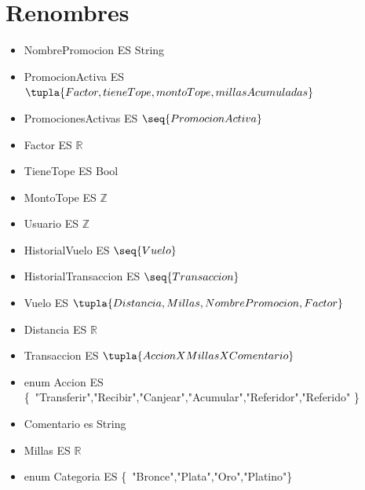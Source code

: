 \documentclass[11pt,a4paper]{article}
\begin{document}
\maketitle

\section{Renombres}

\begin{itemize}
    \item[]NombrePromocion ES String
    \item[]PromocionActiva ES $\tupla{Factor, tieneTope, montoTope, millasAcumuladas}$
    \item[]PromocionesActivas ES $\seq{PromocionActiva}$
    \item[]Factor ES $\mathbb{R}$ 
    \item[]TieneTope ES Bool
    \item[]MontoTope ES $\mathbb{Z}$    
    \item[]Usuario ES $\mathbb{Z}$  
    \item[]HistorialVuelo ES $\seq{Vuelo}$
    \item[]HistorialTransaccion ES $\seq{Transaccion}$
    \item[]Vuelo ES $\tupla{Distancia,Millas,NombrePromocion,Factor}$
    \item[]Distancia ES $\mathbb{R}$
    \item[]Transaccion ES $\tupla{Accion X Millas X Comentario}$
    \item[]enum Accion ES \{\ "Transferir","Recibir","Canjear","Acumular","Referidor","Referido" \}\ 
    \item[]Comentario es String 
    \item[]Millas ES $\mathbb{R}$     
    \item[]enum Categoria ES \{\ "Bronce","Plata","Oro","Platino"\}\
    
\end{itemize}
\end{document}

